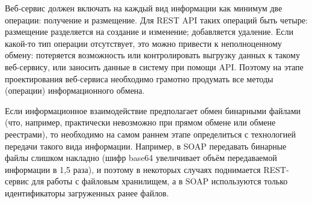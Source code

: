 Веб-сервис должен включать на каждый вид информации как минимум две операции: получение и размещение.
Для REST API таких операций быть четыре: размещение разделяется на создание и изменение; добавляется удаление.
Если какой-то тип операции отсутствует, это можно привести к неполноценному обмену: потеряется возможность или контролировать выгрузку данных к такому веб-сервису, или заносить данные в систему при помощи API.
Поэтому на этапе проектирования веб-сервиса необходимо грамотно продумать все методы (операции) информационного обмена.

Если информационное взаимодействие предполагает обмен бинарными файлами (что, например, практически невозможно при прямом обмене или обмене реестрами), то необходимо на самом раннем этапе определиться с технологией передачи такого вида информации.
Например, в SOAP передавать бинарные файлы слишком накладно (шифр base64 увеличивает объём передаваемой информации в 1,5 раза), и поэтому в некоторых случаях поднимается REST-сервис для работы с файловым хранилищем, а в SOAP используются только идентификаторы загруженных ранее файлов.

\clearpage
\newpage